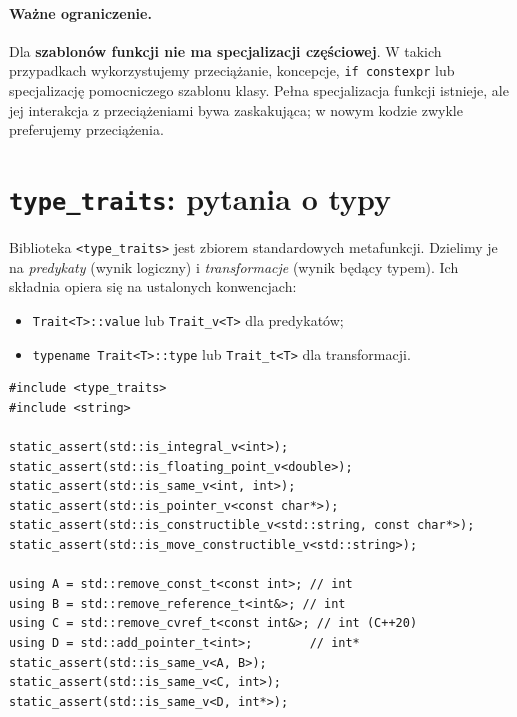 \paragraph{Ważne ograniczenie.}
Dla \textbf{szablonów funkcji nie ma specjalizacji częściowej}.
W takich przypadkach wykorzystujemy przeciążanie, koncepcje,
\texttt{if constexpr} lub specjalizację pomocniczego szablonu klasy.
Pełna specjalizacja funkcji istnieje, ale jej interakcja z przeciążeniami
bywa zaskakująca; w nowym kodzie zwykle preferujemy przeciążenia.

\section{\texttt{type\_traits}: pytania o typy}
\label{sec:cpp9-traits}

Biblioteka \texttt{<type\_traits>} jest zbiorem standardowych metafunkcji.
Dzielimy je na \emph{predykaty} (wynik logiczny) i \emph{transformacje}
(wynik będący typem). Ich składnia opiera się na ustalonych konwencjach:
\begin{itemize}
\item \texttt{Trait<T>::value} lub \texttt{Trait\_v<T>} dla predykatów;
\item \texttt{typename Trait<T>::type} lub \texttt{Trait\_t<T>}
      dla transformacji.
\end{itemize}

\begin{lstlisting}
#include <type_traits>
#include <string>

static_assert(std::is_integral_v<int>);
static_assert(std::is_floating_point_v<double>);
static_assert(std::is_same_v<int, int>);
static_assert(std::is_pointer_v<const char*>);
static_assert(std::is_constructible_v<std::string, const char*>);
static_assert(std::is_move_constructible_v<std::string>);

using A = std::remove_const_t<const int>; // int
using B = std::remove_reference_t<int&>; // int
using C = std::remove_cvref_t<const int&>; // int (C++20)
using D = std::add_pointer_t<int>;        // int*
static_assert(std::is_same_v<A, B>);
static_assert(std::is_same_v<C, int>);
static_assert(std::is_same_v<D, int*>);
\end{lstlisting}

